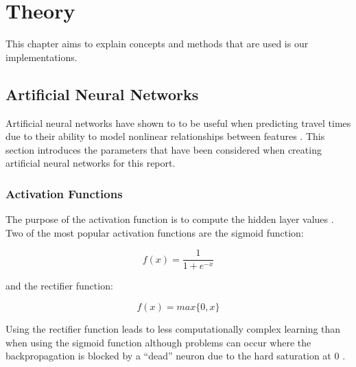 \chapter{Theory}
\label{cha:theory}
This chapter aims to explain concepts and methods that are used is our implementations.


\section{Artificial Neural Networks}
Artificial neural networks have shown to to be useful when predicting travel times due to their ability to model nonlinear relationships between features \cite{brazilANN}\cite{malaysiaANN}. This section introduces the parameters that have been considered when creating artificial neural networks for this report.

\subsection{Activation Functions}
The purpose of the activation function is to compute the hidden layer values \cite{Goodfellow-et-al-2016}. Two of the most popular activation functions are the sigmoid function:

\begin{equation} 
	f(x) = \frac{1}{1+e^{-x}} 
\end{equation}

and the rectifier function:

\begin{equation} 
	f(x) = max\{0,x\}
\end{equation}

Using the rectifier function leads to less computationally complex learning than when using the sigmoid function although problems can occur where the backpropagation is blocked by a ``dead'' neuron due to the hard saturation at 0 \cite{pmlr-v15-glorot11a}.

